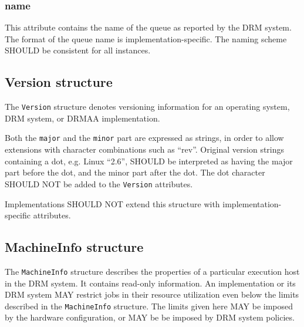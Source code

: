 \documentclass{article}
\newcommand{\h}[1]{\lstinline|#1|}
\newcommand{\rat}[1]{}
\begin{document}


\subsubsection{name}

This attribute contains the name of the queue as reported by the DRM system. The format of the queue name is implementation-specific. The naming scheme SHOULD be consistent for all instances.

\subsection{Version structure}
\label{sec:version}

The \h{Version} structure denotes versioning information for an operating system, DRM system, or DRMAA implementation.



Both the \h{major} and the \h{minor} part are expressed as strings, in order to allow extensions with character combinations such as \enquote{rev}. Original version strings containing a dot, e.g. Linux \enquote{2.6}, SHOULD be interpreted as having the major part before the dot, and the minor part after the dot. The dot character SHOULD NOT be added to the \h{Version} attributes.

Implementations SHOULD NOT extend this structure with implementation-specific attributes.

\rat{
We could see no use case in doing implementation-specific extensions here, so this structure is not considered in DrmaaReflective. Another reason is that versioning information may be used for control flow decisions. Therefore, it should be portable in all cases.
}

\subsection{MachineInfo structure}
\label{sec:machine}

The \h{MachineInfo} structure describes the properties of a particular execution host in the DRM system. It contains read-only information. An implementation or its DRM system MAY restrict jobs in their resource utilization even below the limits described in the \h{MachineInfo} structure. The limits given here MAY be imposed by the hardware configuration, or MAY be be imposed by DRM system policies.
\end{document}
